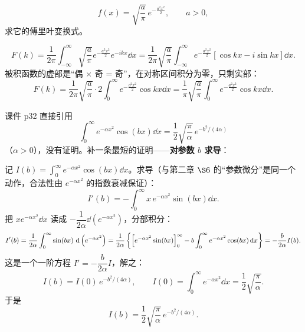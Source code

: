 \documentclass[11pt]{ctexart}
\begin{document}



\[ f(x)=\sqrt{\frac{a}{\pi}}\,e^{-\frac{a^{2}x^{2}}{2}},\qquad a>0 ,\]
求它的傅里叶变换式。


\[
F(k)=\frac{1}{2\pi}\int_{-\infty}^{\infty}\sqrt{\frac{a}{\pi}}e^{-\frac{a^{2}x^{2}}{2}}e^{-ikx}\dd x
=\frac{1}{2\pi}\sqrt{\frac{a}{\pi}}\int_{-\infty}^{\infty}e^{-\frac{a^{2}x^{2}}{2}}\left[\cos kx-i\sin kx\right]\dd x .
\]
被积函数的虚部是“偶 $\times$ 奇 = 奇”，在对称区间积分为零，只剩实部：
\[
F(k)=\frac{1}{2\pi}\sqrt{\frac{a}{\pi}}\cdot 2\int_0^{\infty}e^{-\frac{a^{2}x^{2}}{2}}\cos kx\dd x
=\frac{1}{\pi}\sqrt{\frac{a}{\pi}}\int_0^{\infty}e^{-\frac{a^{2}x^{2}}{2}}\cos kx\dd x .
\]


课件 p32 直接引用
\[ \int_0^{\infty}e^{-\alpha x^{2}}\cos(bx)\dd x=\frac{1}{2}\sqrt{\frac{\pi}{\alpha}}\,e^{-b^{2}/(4\alpha)} \]
（$\alpha>0$），没有证明。补一条最短的证明——\textbf{对参数 $b$ 求导}：

记 $I(b)=\displaystyle\int_0^{\infty}e^{-\alpha x^{2}}\cos(bx)\dd x$。求导（与第二章 $\S6$ 的“参数微分”是同一个动作，合法性由 $e^{-\alpha x^2}$ 的指数衰减保证）：
\[
I'(b)=-\int_0^{\infty}x\,e^{-\alpha x^{2}}\sin(bx)\dd x .
\]
把 $x e^{-\alpha x^{2}}\dd x$ 读成 $-\dfrac{1}{2\alpha}\dd\left(e^{-\alpha x^{2}}\right)$，分部积分：
\[
I'(b)=\frac{1}{2\alpha}\int_0^{\infty}\sin(bx)\,\,\mathrm{d}\left(e^{-\alpha x^{2}}\right)
=\frac{1}{2\alpha}\left\{\Bigl[e^{-\alpha x^{2}}\sin(bx)\Bigr]_0^{\infty}-b\int_0^{\infty}e^{-\alpha x^{2}}\cos(bx)\,\mathrm{d} x\right\}
=-\frac{b}{2\alpha}I(b) .
\]
这是一个一阶方程 $I'=-\dfrac{b}{2\alpha}I$，解之：
\[ I(b)=I(0)\,e^{-b^{2}/(4\alpha)},\qquad I(0)=\int_0^{\infty}e^{-\alpha x^{2}}\dd x=\frac{1}{2}\sqrt{\frac{\pi}{\alpha}} .\]
于是
\[ I(b)=\frac{1}{2}\sqrt{\frac{\pi}{\alpha}}\,e^{-b^{2}/(4\alpha)} .\]

\end{document}
